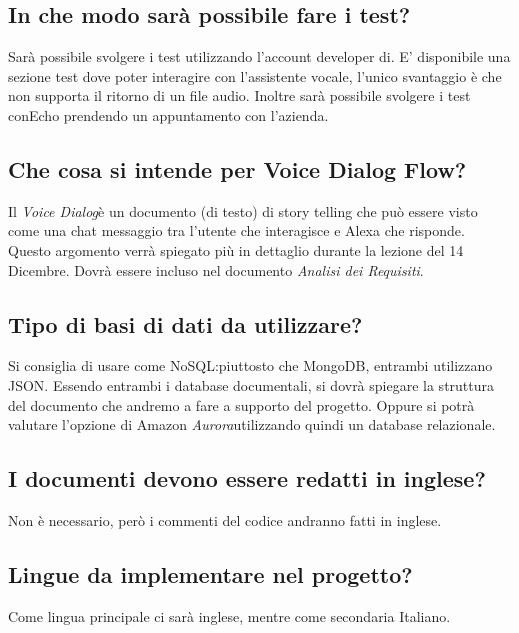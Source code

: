 \documentclass[a4paper,12pt]{article}
\begin{document}
	\subsection{In che modo sarà possibile fare i test?}
	Sarà possibile svolgere i test utilizzando l'account developer di. E' disponibile una sezione test dove poter interagire con l'assistente vocale, l'unico svantaggio è che non supporta il ritorno di un file audio. Inoltre sarà possibile svolgere i test conEcho prendendo un appuntamento con l'azienda.

	\subsection{Che cosa si intende per Voice Dialog Flow?}
	Il \textit{Voice Dialog}è un documento (di testo) di story telling che può essere visto come una chat messaggio tra l'utente che interagisce e Alexa che risponde. \\
	Questo argomento verrà spiegato più in dettaglio durante la lezione del 14 Dicembre. Dovrà essere incluso nel documento \textit{Analisi dei Requisiti}.

	\subsection{Tipo di basi di dati da utilizzare?}
	Si consiglia di usare come NoSQL:piuttosto che MongoDB, entrambi utilizzano JSON. Essendo entrambi i database documentali, si dovrà spiegare la struttura del documento che andremo a fare a supporto del progetto. Oppure si potrà valutare l'opzione di Amazon \textit{Aurora}utilizzando quindi un database relazionale.

	\subsection{I documenti devono essere redatti in inglese?}
	Non è necessario, però i commenti del codice andranno fatti in inglese.

	\subsection{Lingue da implementare nel progetto?}
	Come lingua principale ci sarà inglese, mentre come secondaria Italiano.
\end{document}
